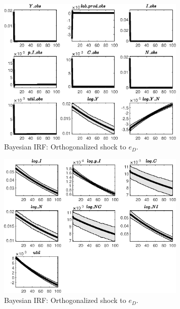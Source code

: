 \begin{figure}[H]
\centering 
\includegraphics[width=0.80\textwidth]{BRS_imp_mobility/Output/BRS_imp_mobility_Bayesian_IRF_e_D_1}
\caption{Bayesian IRF: Orthogonalized shock to ${e_D}$.}
\label{Fig:BayesianIRF:e_D:1}
\end{figure}
 
\begin{figure}[H]
\centering 
\includegraphics[width=0.80\textwidth]{BRS_imp_mobility/Output/BRS_imp_mobility_Bayesian_IRF_e_D_2}
\caption{Bayesian IRF: Orthogonalized shock to ${e_D}$.}
\label{Fig:BayesianIRF:e_D:2}
\end{figure}
 
